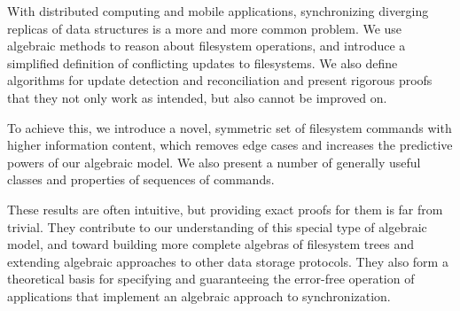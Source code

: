 
With distributed computing and mobile applications,
synchronizing diverging replicas of data structures is a more and more common problem.
We use algebraic methods to reason about filesystem operations, 
and introduce a simplified definition of conflicting updates to filesystems.
We also define algorithms for update detection and reconciliation
and present rigorous proofs that they not only work as intended,
but also cannot be improved on.

To achieve this, we introduce a novel, symmetric set of filesystem commands
with higher information content,
which removes edge cases
and increases the predictive powers of our algebraic model.
We also present a number of generally useful classes and properties
of sequences of commands.

These results are often intuitive,
but providing exact proofs for them is far from trivial.
They contribute to our understanding of this special type of algebraic model,
and toward building more complete algebras
of filesystem trees 
and extending algebraic approaches to other data storage protocols.
They also form a theoretical basis for
specifying
and guaranteeing the error-free operation
of applications that implement an algebraic approach to synchronization.
